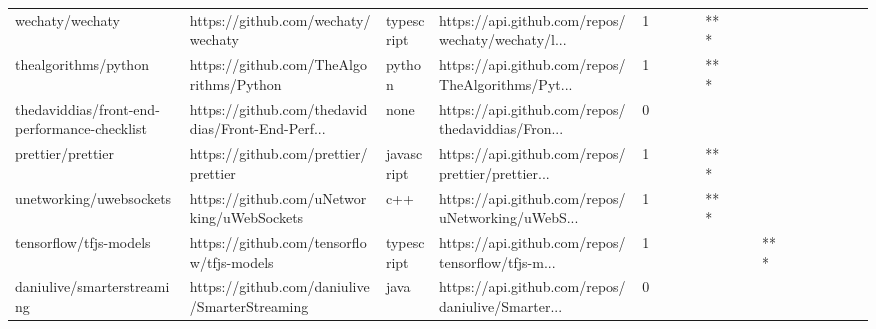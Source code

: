 \begin{tabular}{llllrlllllllllllll}
wechaty/wechaty                                    &                 https://github.com/wechaty/wechaty &        typescript &  https://api.github.com/repos/wechaty/wechaty/l... &       1 &         &        &           &            *** &                 &        &           &           &          &          &       &              &          \\
thealgorithms/python                               &            https://github.com/TheAlgorithms/Python &            python &  https://api.github.com/repos/TheAlgorithms/Pyt... &       1 &         &        &           &            *** &                 &        &           &           &          &          &       &              &          \\
thedaviddias/front-end-performance-checklist       &  https://github.com/thedaviddias/Front-End-Perf... &              none &  https://api.github.com/repos/thedaviddias/Fron... &       0 &         &        &           &                &                 &        &           &           &          &          &       &              &          \\
prettier/prettier                                  &               https://github.com/prettier/prettier &        javascript &  https://api.github.com/repos/prettier/prettier... &       1 &         &        &           &            *** &                 &        &           &           &          &          &       &              &          \\
unetworking/uwebsockets                            &         https://github.com/uNetworking/uWebSockets &               c++ &  https://api.github.com/repos/uNetworking/uWebS... &       1 &         &        &           &            *** &                 &        &           &           &          &          &       &              &          \\
tensorflow/tfjs-models                             &          https://github.com/tensorflow/tfjs-models &        typescript &  https://api.github.com/repos/tensorflow/tfjs-m... &       1 &         &        &           &                &                 &        &       *** &           &          &          &       &              &          \\
daniulive/smarterstreaming                         &      https://github.com/daniulive/SmarterStreaming &              java &  https://api.github.com/repos/daniulive/Smarter... &       0 &         &        &           &                &                 &        &           &           &          &          &       &              &          \\

\end{tabular}
